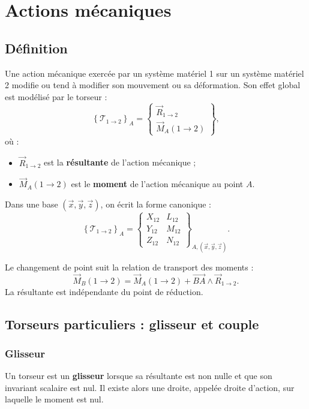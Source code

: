 \section{Actions mécaniques}

\subsection{Définition}

Une action mécanique exercée par un système matériel 1 sur un système matériel 2 modifie ou tend à modifier son mouvement ou sa déformation. Son effet global est modélisé par le torseur :
\[
\left\{\mathcal T_{1\rightarrow2}\right\}_A=
\left\{
\begin{array}{c}
\vec R_{1\rightarrow2}\\[1mm]
\vec M_A(1\rightarrow2)
\end{array}
\right\},
\]
où :
\begin{itemize}
  \item $\vec R_{1\rightarrow2}$ est la \textbf{résultante} de l'action mécanique ;
  \item $\vec M_A(1\rightarrow2)$ est le \textbf{moment} de l'action mécanique au point $A$.
\end{itemize}

Dans une base $(\vec x,\vec y,\vec z)$, on écrit la forme canonique :
\[
\left\{\mathcal T_{1\rightarrow2}\right\}_A=
\left\{
\begin{array}{cc}
X_{12} & L_{12}\\
Y_{12} & M_{12}\\
Z_{12} & N_{12}
\end{array}
\right\}_{A,(\vec x,\vec y,\vec z)}.
\]

Le changement de point suit la relation de transport des moments :
\[
\vec M_B(1\rightarrow2)=
\vec M_A(1\rightarrow2)+\overrightarrow{BA}\wedge\vec R_{1\rightarrow2}.
\]
La résultante est indépendante du point de réduction.

\subsection{Torseurs particuliers : glisseur et couple}

\subsubsection{Glisseur}

Un torseur est un \textbf{glisseur} lorsque sa résultante est non nulle et que son invariant scalaire est nul. Il existe alors une droite, appelée droite d'action, sur laquelle le moment est nul.

